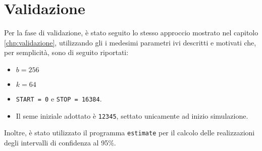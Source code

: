 \section{Validazione}\label{sec:miglioria-validazione}
Per la fase di validazione, è stato seguito lo stesso approccio mostrato nel capitolo \ref{chp:validazione}, utilizzando gli
i medesimi parametri ivi descritti e motivati che, per semplicità, sono di seguito riportati:
\begin{itemize}
\item $b = 256$
\item $k = 64$
\item \texttt{START = 0} e \texttt{STOP = 16384}.
\item Il seme iniziale adottato è \texttt{12345}, settato unicamente ad inizio simulazione.
\end{itemize}
Inoltre, è stato utilizzato il programma \texttt{estimate} per il calcolo delle realizzazioni degli intervalli di confidenza al 95\%.

\newpage
